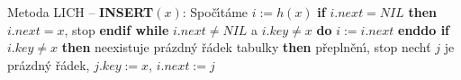 \flushpar Metoda LICH -- {\bf INSERT$(x)$}:\newline 
Spo\v c\'\i t\'ame $i:=h(x)$\newline 
{\bf if} $i.next=NIL$ {\bf then} $i.next=x$, stop {\bf endif\newline 
while} $i.next\ne NIL$ a $i.key\ne x$ {\bf do} $i:=i.next$ {\bf enddo\newline 
if} $i.key\ne x$ {\bf then}\newline 
\phantom{---}{\bf if} neexistuje pr\'azdn\'y \v r\'adek tabulky {\bf then}\newline 
\phantom{------}p\v repln\v en\'\i, stop\newline 
\phantom{---}{\bf else}\newline 
\phantom{------}nech\v t $j$ je pr\'azdn\'y \v r\'adek, $j.key:=x$, $i.next:=j$\newline 
\phantom{---}{\bf endif\newline 
endif}
\medskip

